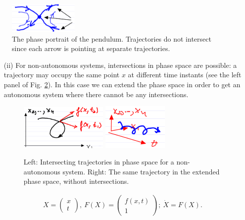 		\begin{figure}[H]
			\centering
			\includegraphics[width=0.3\textwidth]{figures/ch1/3pendulum_trajectories.png}
			\caption{The phase portrait of the pendulum. Trajectories do not intersect since each arrow is pointing at separate trajectories.}
			\label{fig:chap1:3}

		\end{figure}
\begin{itemize}
	\item[(ii)] For non-autonomous systems, intersections in phase space are possible: a trajectory may occupy the same point $x$ at different time instants (see the left panel of Fig. \ref{fig:chap1:4}). In this case we can extend the phase space in order to get an autonomous system where there cannot be any intersections.
			\begin{figure}[H]
			\centering
			\includegraphics[width=0.4\textwidth]{figures/ch1/4intersecting_trajectories.png}
			\hspace{0.05\textwidth}
			\includegraphics[width=0.3\textwidth]{figures/ch1/5extended_space.png}
			\caption{Left: Intersecting trajectories in phase space for a non-autonomous system. Right: The same trajectory in the extended phase space, without intersections.}
			\label{fig:chap1:4}

		\end{figure}
		
		\begin{align}
			X = 
			\begin{pmatrix}
				x \\ t
			\end{pmatrix},\
			F(X) = 
			\begin{pmatrix}
				f(x,t) \\ 1
			\end{pmatrix};\
			\dot{X} = F(X).
		\end{align}
\end{itemize}

